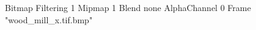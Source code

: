 {Bitmap
	{Filtering 1}
	{Mipmap 1}
	{Blend none}
	{AlphaChannel 0}
	{Frame "wood_mill_x.tif.bmp"}
}
